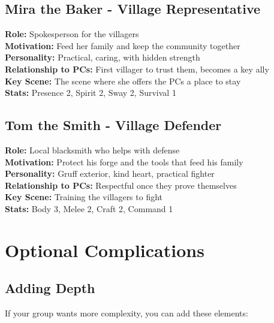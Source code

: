 \documentclass[11pt]{article}
\newenvironment{characterbox}[1]{%
  \begin{mdframed}[backgroundcolor=shadecolor, linewidth=1pt, linecolor=headercolor]%
  \subsection*{#1}%
}{%
  \end{mdframed}%
}
\begin{document}
\begin{characterbox}{Mira the Baker - Village Representative}
\textbf{Role:} Spokesperson for the villagers \\
\textbf{Motivation:} Feed her family and keep the community together \\
\textbf{Personality:} Practical, caring, with hidden strength \\
\textbf{Relationship to PCs:} First villager to trust them, becomes a key ally \\
\textbf{Key Scene:} The scene where she offers the PCs a place to stay \\
\textbf{Stats:} Presence 2, Spirit 2, Sway 2, Survival 1
\end{characterbox}

\begin{characterbox}{Tom the Smith - Village Defender}
\textbf{Role:} Local blacksmith who helps with defense \\
\textbf{Motivation:} Protect his forge and the tools that feed his family \\
\textbf{Personality:} Gruff exterior, kind heart, practical fighter \\
\textbf{Relationship to PCs:} Respectful once they prove themselves \\
\textbf{Key Scene:} Training the villagers to fight \\
\textbf{Stats:} Body 3, Melee 2, Craft 2, Command 1
\end{characterbox}

\section{Optional Complications}

\subsection{Adding Depth}

If your group wants more complexity, you can add these elements:
\end{document}
